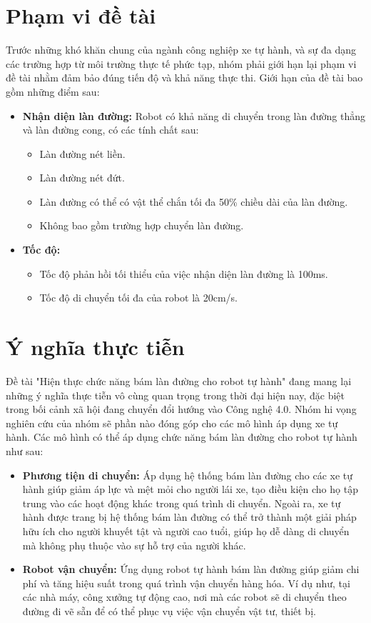 \section{Phạm vi đề tài}
Trước những khó khăn chung của ngành công nghiệp xe tự hành, và sự đa dạng các trường hợp từ môi trường thực tế phức tạp, nhóm phải giới hạn lại phạm vi đề tài nhằm đảm bảo đúng tiến độ và khả năng thực thi. Giới hạn của đề tài bao gồm những điểm sau:
\begin{itemize}
    \item \textbf{Nhận diện làn đường:} Robot có khả năng di chuyển trong làn đường thẳng và làn đường cong, có các tính chất sau:
        \begin{itemize}
            \item Làn đường nét liền.
            \item Làn đường nét đứt.
            \item Làn đường có thể có vật thể chắn tối đa 50\% chiều dài của làn đường.
            \item Không bao gồm trường hợp chuyển làn đường.
        \end{itemize}
    \item \textbf{Tốc độ:} 
        \begin{itemize}
            \item Tốc độ phản hồi tối thiểu của việc nhận diện làn đường là 100ms.
            \item Tốc độ di chuyển tối đa của robot là 20cm/s.
        \end{itemize}
\end{itemize}
\section{Ý nghĩa thực tiễn}
\tab Đề tài "Hiện thực chức năng bám làn đường cho robot tự hành" đang mang lại những ý nghĩa thực tiễn vô cùng quan trọng trong thời đại hiện nay, đặc biệt trong bối cảnh xã hội đang chuyển đổi hướng vào Công nghệ 4.0. Nhóm hi vọng nghiên cứu của nhóm sẽ phần nào đóng góp cho các mô hình áp dụng xe tự hành. Các mô hình có thể áp dụng chức năng bám làn đường cho robot tự hành như sau:
\begin{itemize}
    \item \textbf{Phương tiện di chuyển:} Áp dụng hệ thống bám làn đường cho các xe tự hành giúp giảm áp lực và mệt mỏi cho người lái xe, tạo điều kiện cho họ tập trung vào các hoạt động khác trong quá trình di chuyển. Ngoài ra, xe tự hành được trang bị hệ thống bám làn đường có thể trở thành một giải pháp hữu ích cho người khuyết tật và người cao tuổi, giúp họ dễ dàng di chuyển mà không phụ thuộc vào sự hỗ trợ của người khác.
    \item \textbf{Robot vận chuyển:} Ứng dụng robot tự hành bám làn đường giúp giảm chi phí và tăng hiệu suất trong quá trình vận chuyển hàng hóa. Ví dụ như, tại các nhà máy, công xưởng tự động cao, nơi mà các robot sẽ di chuyển theo đường đi vẽ sẵn để có thể phục vụ việc vận chuyển vật tư, thiết bị.
\end{itemize}
